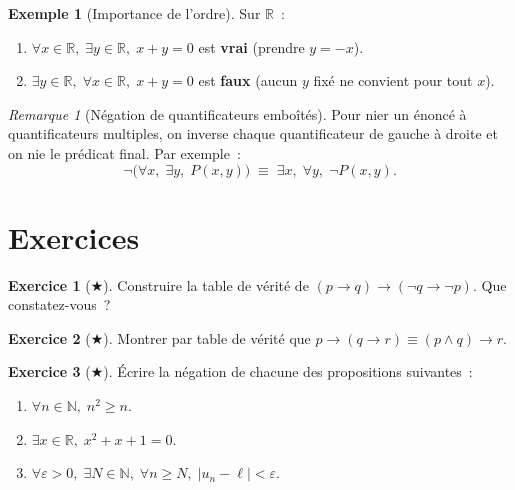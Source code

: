 \documentclass[12pt,a4paper,openany]{book}
\theoremstyle{definition}
\newtheorem{exemple}[definition]{Exemple}
\newtheorem{exercice}{Exercice}[chapter]
\theoremstyle{plain}
\theoremstyle{remark}
\newtheorem{remarque}[definition]{Remarque}
\newcommand{\N}{\mathbb{N}}
\newcommand{\R}{\mathbb{R}}
\newcommand{\abs}[1]{\left|#1\right|}
\begin{document}
\begin{exemple}[Importance de l'ordre]\label{ex:ordre-quantif}
  Sur $\R$~:
  \begin{enumerate}[label=(\alph*)]
    \item $\forall x \in \R,\; \exists y \in \R,\; x + y = 0$ est \textbf{vrai} (prendre $y = -x$).
    \item $\exists y \in \R,\; \forall x \in \R,\; x + y = 0$ est \textbf{faux} (aucun $y$ fix\'e ne convient pour tout $x$).
  \end{enumerate}
\end{exemple}

\begin{remarque}[N\'egation de quantificateurs embo\^it\'es]\label{rem:neg-emboites}
  Pour nier un \'enonc\'e \`a quantificateurs multiples, on inverse chaque quantificateur de gauche \`a droite et on nie le pr\'edicat final. Par exemple~:
  \[
    \neg\bigl(\forall x,\; \exists y,\; P(x,y)\bigr)
    \;\equiv\; \exists x,\; \forall y,\; \neg P(x,y).
  \]
\end{remarque}

\section{Exercices}
\label{sec:exo-logique}

\begin{exercice}[$\bigstar$]\label{exo:table-verite-1}
  Construire la table de v\'erit\'e de $(p \to q) \to (\neg q \to \neg p)$. Que constatez-vous~?
\end{exercice}

\begin{exercice}[$\bigstar$]\label{exo:equiv-simple}
  Montrer par table de v\'erit\'e que $p \to (q \to r) \equiv (p \land q) \to r$.
\end{exercice}

\begin{exercice}[$\bigstar$]\label{exo:negation-simple}
  \'Ecrire la n\'egation de chacune des propositions suivantes~:
  \begin{enumerate}[label=(\alph*)]
    \item $\forall n \in \N, \; n^2 \geq n$.
    \item $\exists x \in \R, \; x^2 + x + 1 = 0$.
    \item $\forall \varepsilon > 0, \; \exists N \in \N, \; \forall n \geq N, \; \abs{u_n - \ell} < \varepsilon$.
  \end{enumerate}
\end{exercice}
\end{document}
